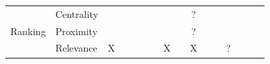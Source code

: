 \begin{table}[htbp]
\begin{tabular}{rrcccccccccccccc}
    \multicolumn{1}{l}{\multirow{3}[0]{*}{Ranking}} & \multicolumn{1}{l}{Centrality} &       &       &       &       &       &       &       & ?     &       &       &       &       &       &  \\
    \multicolumn{1}{l}{} & \multicolumn{1}{l}{Proximity} &       &       &       &       &       &       &       & ?     &       &       &       &       &       &  \\
    \multicolumn{1}{l}{} & \multicolumn{1}{l}{Relevance} & X     &       &       &       &       & X     &       & X     &       &       & ?     &       &       &  \\
    \end{tabular}%
  \label{tab:examples}%
\end{table}%


